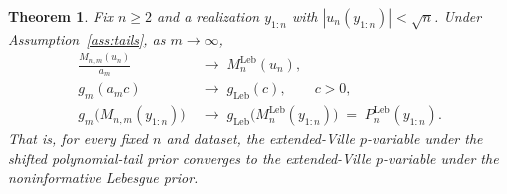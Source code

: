 \documentclass{article}%
\newtheorem{theorem}{Theorem}[section]
\newcommand{\Leb}{\mathrm{Leb}}
\newcommand{\1}{\mathbf{1}}
\begin{document}
\begin{theorem}\label{thm:recovery}
Fix \(n\geq 2\) and a realization \(y_{1:n}\) with
\(|u_n(y_{1:n})|<\sqrt n\). Under
Assumption~\ref{ass:tails}, as \(m\to\infty\),
\begin{align}
  \frac{M_{n,m}(u_n)}{a_m}
   &\;\longrightarrow\; M_n^{\Leb}(u_n),
   \label{eq:Mnm-asymp}\\
  g_m(a_m c)
   &\;\longrightarrow\; g_{\Leb}(c),\qquad c>0,
   \label{eq:gm-asymp}\\
  g_m\!\bigl(M_{n,m}(y_{1:n})\bigr)
   &\;\longrightarrow\;
   g_{\Leb}\!\bigl(M_n^{\Leb}(y_{1:n})\bigr)
   \;=\;P_n^{\Leb}(y_{1:n}).
   \label{eq:p-asymp}
\end{align}
That is, for every fixed \(n\) and dataset, the extended-Ville $p$-variable under the shifted polynomial-tail prior converges to the extended-Ville $p$-variable under the noninformative Lebesgue prior.
\end{theorem}
\end{document}
